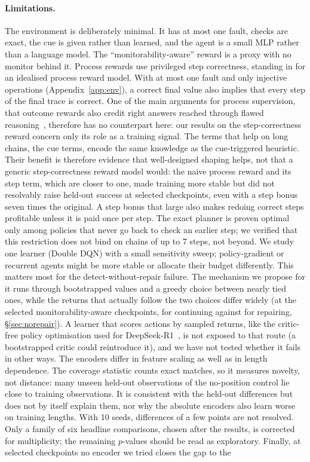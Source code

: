 \paragraph{Limitations.}
The environment is deliberately minimal. It has at most one fault, checks are exact, the cue is given rather than learned, and the agent is a small MLP rather than a language model. The ``monitorability-aware'' reward is a proxy with no monitor behind it. Process rewards use privileged step correctness, standing in for an idealised process reward model. With at most one fault and only injective operations (Appendix~\ref{app:env}), a correct final value also implies that every step of the final trace is correct. One of the main arguments for process supervision, that outcome rewards also credit right answers reached through flawed reasoning~\citep{uesato2022process,lightman2024verify}, therefore has no counterpart here: our results on the step-correctness reward concern only its role as a training signal. The terms that help on long chains, the cue terms, encode the same knowledge as the cue-triggered heuristic. Their benefit is therefore evidence that well-designed shaping helps, not that a generic step-correctness reward model would: the naive process reward and its step term, which are closer to one, made training more stable but did not resolvably raise held-out success at selected checkpoints, even with a step bonus seven times the original. A step bonus that large also makes redoing correct steps profitable unless it is paid once per step. The exact planner is proven optimal only among policies that never go back to check an earlier step; we verified that this restriction does not bind on chains of up to 7 steps, not beyond. We study one learner (Double DQN) with a small sensitivity sweep; policy-gradient or recurrent agents might be more stable or allocate their budget differently. This matters most for the detect-without-repair failure. The mechanism we propose for it runs through bootstrapped values and a greedy choice between nearly tied ones, while the returns that actually follow the two choices differ widely (at the selected monitorability-aware checkpoints,  for continuing against  for repairing, \S\ref{sec:norepair}). A learner that scores actions by sampled returns, like the critic-free policy optimisation used for DeepSeek-R1~\citep{deepseek2025r1}, is not exposed to that route (a bootstrapped critic could reintroduce it), and we have not tested whether it fails in other ways. The encoders differ in feature scaling as well as in length dependence. The coverage statistic counts exact matches, so it measures novelty, not distance: many unseen held-out observations of the no-position control lie close to training observations. It is consistent with the held-out differences but does not by itself explain them, nor why the absolute encoders also learn worse on training lengths. With 10 seeds, differences of a few points are not resolved. Only a family of six headline comparisons, chosen after the results, is corrected for multiplicity; the remaining $p$-values should be read as exploratory. Finally, at selected checkpoints no encoder we tried closes the gap to the 